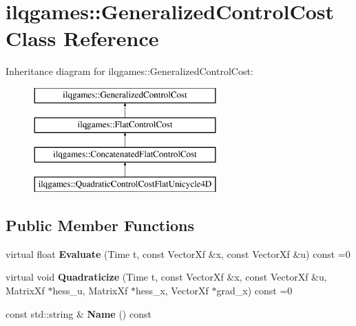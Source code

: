 \hypertarget{classilqgames_1_1_generalized_control_cost}{}\section{ilqgames\+:\+:Generalized\+Control\+Cost Class Reference}
\label{classilqgames_1_1_generalized_control_cost}
Inheritance diagram for ilqgames\+:\+:Generalized\+Control\+Cost\+:\begin{figure}[H]
\begin{center}
\leavevmode
\includegraphics[height=4.000000cm]{classilqgames_1_1_generalized_control_cost}
\end{center}
\end{figure}
\subsection*{Public Member Functions}
\begin{DoxyCompactItemize}
\item 
virtual float {\bfseries Evaluate} (Time t, const Vector\+Xf \&x, const Vector\+Xf \&u) const =0\hypertarget{classilqgames_1_1_generalized_control_cost_a37d8eab41dcf8b3f5b1017fb2e97244e}{}\label{classilqgames_1_1_generalized_control_cost_a37d8eab41dcf8b3f5b1017fb2e97244e}

\item 
virtual void {\bfseries Quadraticize} (Time t, const Vector\+Xf \&x, const Vector\+Xf \&u, Matrix\+Xf $\ast$hess\+\_\+u, Matrix\+Xf $\ast$hess\+\_\+x, Vector\+Xf $\ast$grad\+\_\+x) const =0\hypertarget{classilqgames_1_1_generalized_control_cost_a30b04b52335d4c47d954c45fbf6dfb24}{}\label{classilqgames_1_1_generalized_control_cost_a30b04b52335d4c47d954c45fbf6dfb24}

\item 
const std\+::string \& {\bfseries Name} () const \hypertarget{classilqgames_1_1_generalized_control_cost_a46f5f1fa4300ada4fca6449c8ab7b27e}{}\label{classilqgames_1_1_generalized_control_cost_a46f5f1fa4300ada4fca6449c8ab7b27e}

\end{DoxyCompactItemize}
